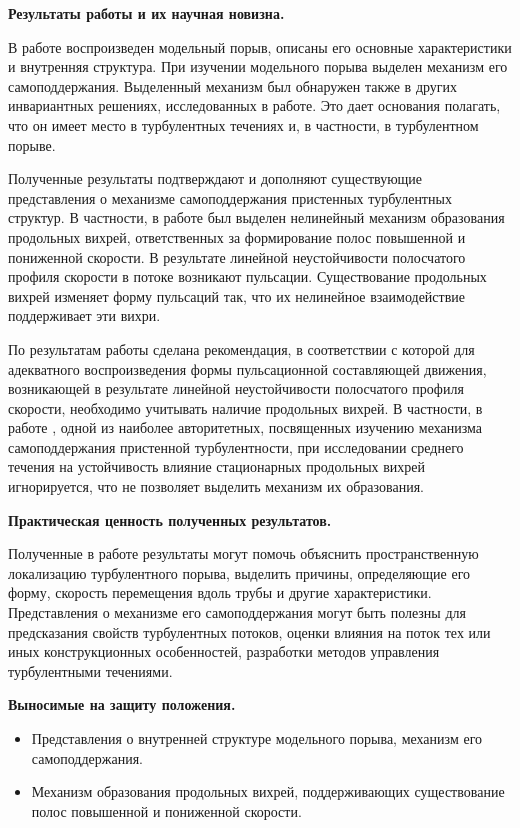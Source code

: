 {\bf Результаты работы и их научная новизна.}

В работе воспроизведен модельный порыв, описаны его основные характеристики и внутренняя структура. При изучении модельного порыва выделен механизм его самоподдержания. Выделенный механизм был обнаружен также в других инвариантных решениях, исследованных в работе. Это дает основания полагать, что он имеет место в турбулентных течениях и, в частности, в турбулентном порыве.

Полученные результаты подтверждают и дополняют существующие представления о механизме самоподдержания пристенных турбулентных структур. В частности, в работе был выделен нелинейный механизм образования продольных вихрей, ответственных за формирование полос повышенной и пониженной скорости. В результате линейной неустойчивости полосчатого профиля скорости в потоке возникают пульсации. Существование продольных вихрей изменяет форму пульсаций так, что их нелинейное взаимодействие поддерживает эти вихри. 

По результатам работы сделана рекомендация, в соответствии с которой для адекватного воспроизведения формы пульсационной составляющей движения, возникающей в результате линейной неустойчивости полосчатого профиля скорости, необходимо учитывать наличие продольных вихрей. В частности, в работе \cite{Schoppa2002}, одной из наиболее авторитетных, посвященных изучению механизма самоподдержания пристенной турбулентности, при исследовании среднего течения на устойчивость влияние стационарных продольных вихрей игнорируется, что не позволяет выделить механизм их образования. 


{\bf Практическая ценность полученных результатов.}

Полученные в работе результаты могут помочь объяснить пространственную локализацию турбулентного порыва, выделить причины, определяющие его форму, скорость перемещения вдоль трубы и другие характеристики. Представления о механизме его самоподдержания могут быть полезны для предсказания свойств турбулентных потоков, оценки влияния на поток тех или иных конструкционных особенностей, разработки методов управления турбулентными течениями. 


{\bf Выносимые на защиту положения.}

\begin{itemize}
\item Представления о внутренней структуре модельного порыва, механизм его самоподдержания. 
\item Механизм образования продольных вихрей, поддерживающих существование полос повышенной и пониженной скорости. 
\end{itemize}

